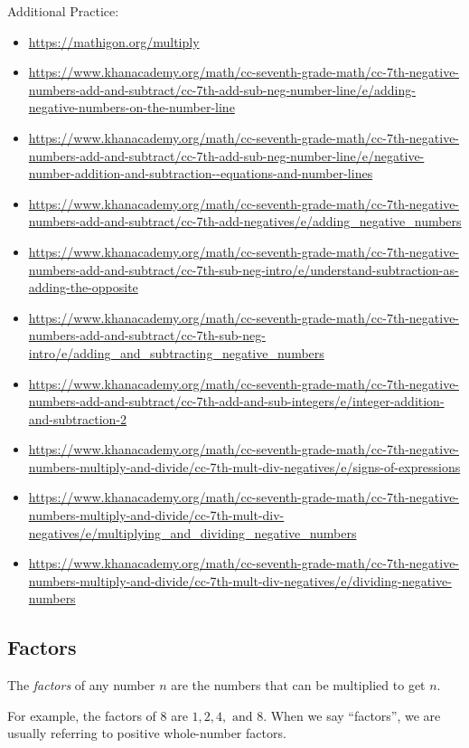 Additional Practice: 
\begin{itemize}
	\item {\footnotesize \url{https://mathigon.org/multiply}}
	\item {\footnotesize \url{https://www.khanacademy.org/math/cc-seventh-grade-math/cc-7th-negative-numbers-add-and-subtract/cc-7th-add-sub-neg-number-line/e/adding-negative-numbers-on-the-number-line}}
	\item {\footnotesize \url{https://www.khanacademy.org/math/cc-seventh-grade-math/cc-7th-negative-numbers-add-and-subtract/cc-7th-add-sub-neg-number-line/e/negative-number-addition-and-subtraction--equations-and-number-lines}}
	\item {\footnotesize \url{https://www.khanacademy.org/math/cc-seventh-grade-math/cc-7th-negative-numbers-add-and-subtract/cc-7th-add-negatives/e/adding_negative_numbers}}
	\item {\footnotesize \url{https://www.khanacademy.org/math/cc-seventh-grade-math/cc-7th-negative-numbers-add-and-subtract/cc-7th-sub-neg-intro/e/understand-subtraction-as-adding-the-opposite}}
	\item {\footnotesize \url{https://www.khanacademy.org/math/cc-seventh-grade-math/cc-7th-negative-numbers-add-and-subtract/cc-7th-sub-neg-intro/e/adding_and_subtracting_negative_numbers}}
	\item {\footnotesize \url{https://www.khanacademy.org/math/cc-seventh-grade-math/cc-7th-negative-numbers-add-and-subtract/cc-7th-add-and-sub-integers/e/integer-addition-and-subtraction-2}}

	\item {\footnotesize \url{https://www.khanacademy.org/math/cc-seventh-grade-math/cc-7th-negative-numbers-multiply-and-divide/cc-7th-mult-div-negatives/e/signs-of-expressions}}	
	\item {\footnotesize \url{https://www.khanacademy.org/math/cc-seventh-grade-math/cc-7th-negative-numbers-multiply-and-divide/cc-7th-mult-div-negatives/e/multiplying_and_dividing_negative_numbers}}	
	\item {\footnotesize \url{https://www.khanacademy.org/math/cc-seventh-grade-math/cc-7th-negative-numbers-multiply-and-divide/cc-7th-mult-div-negatives/e/dividing-negative-numbers}}	
\end{itemize}




\newpage 
\subsection{Factors}
\begin{definition}[Factor]
The \emph{factors} of any number \(n\) are the numbers that can be multiplied to get \(n\).  

For example, the factors of \(8\) are \(1, 2, 4, \text{ and } 8\). When we say ``factors'', we are usually referring to positive whole-number factors. 
\end{definition}


